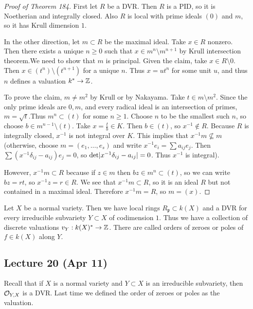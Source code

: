 \documentclass[twoside, 10pt]{article}
\begin{document}
        \begin{proof}[Proof of Theorem 184] First let $R$ be a DVR. Then $R$ is
            a PID, so it is Noetherian and integrally closed. Also $R$ is local
            with prime ideals $(0)$ and $m$, so it has Krull dimension $1$.

            In the other direction, let $m \subset R$ be the maximal ideal.
            Take $x \in R$ nonzero. Then there exists a unique $n \geq 0$ such
            that $x \in m^n \setminus m^{n+1}$ by Krull intersection theorem.We
            need to show that $m$ is principal. Given the claim, take $x \in R
            \setminus 0$. Then $x \in (t^n) \setminus (t^{n+1})$ for a unique
            $n$. Thus $x = ut^n$ for some unit $u$, and thus $n$ defines a
            valuation $k^* \to \mathbb{Z}$.

            To prove the claim, $m \neq m^2$ by Krull or by Nakayama. Take $t
            \in m \setminus m^2$. Since the only prime ideals are $0,m$, and
            every radical ideal is an intersection of primes, $m =
            \sqrt{t}$.Thus $m^n \subset (t)$ for some $n \geq 1$. Choose $n$ to
            be the smallest such $n$, so choose $b \in m^{n-1} \setminus (t)$.
            Take $x = \frac{t}{b} \in K$. Then $b \in (t)$, so $x^{-1} \notin
            R$. Because $R$ is integrally closed, $x^{-1}$ is not integral over
            $K$. This implies that $x^{-1}m \not\subseteq m$ (otherwise, choose
            $m=(e_1, \ldots, e_s)$ and write $x^{-1}e_i = \sum a_{ij} e_j$.
            Then $\sum (x^{-1} \delta_{ij} - a_{ij})e_j = 0$, so $\mathrm{det}
            \lvert x^{-1} \delta_{ij} - a_{ij}\rvert = 0$. Thus $x^{-1}$ is
            integral).

            However, $x^{-1}m \subset R$ because if $z \in m$ then $bz \in m^n
            \subset (t)$, so we can write $bz = rt$, so $x^{-1}z = r \in R$. We
            see that $x^{-1}m \subset R$, so it is an ideal $R$ but not
            contained in a maximal ideal. Therefore $x^{-1}m = R$, so $m =
        (x)$.  \end{proof}

        Let $X$ be a normal variety. Then we have local rings $R_{\mathfrak{p}}
        \subset k(X)$ and a DVR for every irreducible subvariety $Y \subset X$
        of codimension $1$. Thus we have a collection of discrete valuations
        $v_Y: k(X)^* \to \mathbb{Z}$. There are called orders of zeroes or poles of $f
        \in k(X)$ along $Y$.

        \subsection{Lecture 20 (Apr 11)} Recall that if $X$ is a normal variety
        and $Y \subset X$ is an irreducible subvariety, then $\mathcal{O}_{Y,X}$ is
        a DVR. Last time we defined the order of zeroes or poles as the
        valuation.
\end{document}
